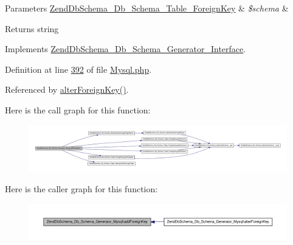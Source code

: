 \begin{DoxyParams}[1]{\-Parameters}
\hyperlink{classZendDbSchema__Db__Schema__Table__ForeignKey}{\-Zend\-Db\-Schema\-\_\-\-Db\-\_\-\-Schema\-\_\-\-Table\-\_\-\-Foreign\-Key} & {\em \$schema} & \\
\hline
\end{DoxyParams}
\begin{DoxyReturn}{\-Returns}
string 
\end{DoxyReturn}


\-Implements \hyperlink{interfaceZendDbSchema__Db__Schema__Generator__Interface_a3fb3373d818831770e2f0b3231c00fba}{\-Zend\-Db\-Schema\-\_\-\-Db\-\_\-\-Schema\-\_\-\-Generator\-\_\-\-Interface}.



\-Definition at line \hyperlink{Schema_2Generator_2Mysql_8php_source_l00392}{392} of file \hyperlink{Schema_2Generator_2Mysql_8php_source}{\-Mysql.\-php}.



\-Referenced by \hyperlink{Schema_2Generator_2Mysql_8php_source_l00426}{alter\-Foreign\-Key()}.



\-Here is the call graph for this function\-:\nopagebreak
\begin{figure}[H]
\begin{center}
\leavevmode
\includegraphics[width=350pt]{classZendDbSchema__Db__Schema__Generator__Mysql_a4b0c6d7fbd4d21f027facb6e495d1f6b_cgraph}
\end{center}
\end{figure}




\-Here is the caller graph for this function\-:\nopagebreak
\begin{figure}[H]
\begin{center}
\leavevmode
\includegraphics[width=350pt]{classZendDbSchema__Db__Schema__Generator__Mysql_a4b0c6d7fbd4d21f027facb6e495d1f6b_icgraph}
\end{center}
\end{figure}


